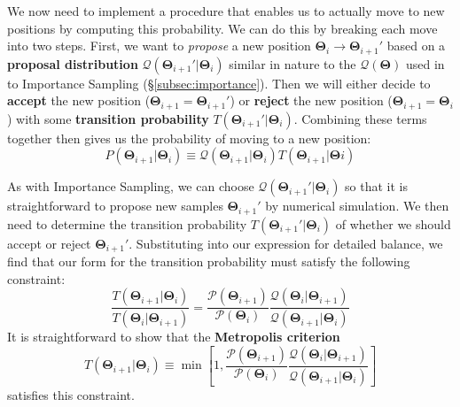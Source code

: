 \documentclass[12pt, titlepage]{article}
\newcommand{\params}{\ensuremath{\boldsymbol\Theta}}
\newcommand{\posterior}{\ensuremath{\mathcal{P}}}
\newcommand{\proposal}{\ensuremath{\mathcal{Q}}}
\begin{document}
We now need to implement a procedure that enables us to actually
move to new positions by computing this probability. 
We can do this by breaking each move into two steps. First,
we want to \textit{propose} a new position 
$\params_i \rightarrow \params_{i+1}'$ based on a
\textbf{proposal distribution} $\proposal(\params_{i+1}'|\params_i)$
similar in nature to the $\proposal(\params)$ used in to 
Importance Sampling (\S\ref{subsec:importance}). 
Then we will either decide to \textbf{accept} the new position
($\params_{i+1}=\params_{i+1}'$) or \textbf{reject} the new position
($\params_{i+1}=\params_i$) with some \textbf{transition probability}
$T(\params_{i+1}'|\params_i)$.
Combining these terms together then gives us the probability
of moving to a new position:
\begin{equation}
    P(\params_{i+1}|\params_i) 
    \equiv \proposal(\params_{i+1}|\params_i) T(\params_{i+1}|\params{i})
\end{equation}

As with Importance Sampling, we can choose $\proposal(\params_{i+1}'|\params_i)$
so that it is straightforward to propose new samples
$\params_{i+1}'$ by numerical simulation. 
We then need to determine the transition probability
$T(\params_{i+1}'|\params_i)$ of whether we should accept 
or reject $\params_{i+1}'$. Substituting into
our expression for detailed balance, we find that our form for the
transition probability must satisfy the following constraint:
\begin{equation}
    \frac{T(\params_{i+1}|\params_i)}{T(\params_i|\params_{i+1})} 
    = \frac{\posterior(\params_{i+1})}{\posterior(\params_i)}
    \frac{\proposal(\params_i|\params_{i+1})}{\proposal(\params_{i+1}|\params_i)}
\end{equation}
It is straightforward to show that the 
\textbf{Metropolis criterion} \cite{metropolis+53_alt}
\begin{equation}
    T(\params_{i+1}|\params_i)
    \equiv \min\left[1, \frac{\posterior(\params_{i+1})}{\posterior(\params_i)}
    \frac{\proposal(\params_i|\params_{i+1})}{\proposal(\params_{i+1}|\params_i)}
    \right]
\end{equation}
satisfies this constraint.
\end{document}
